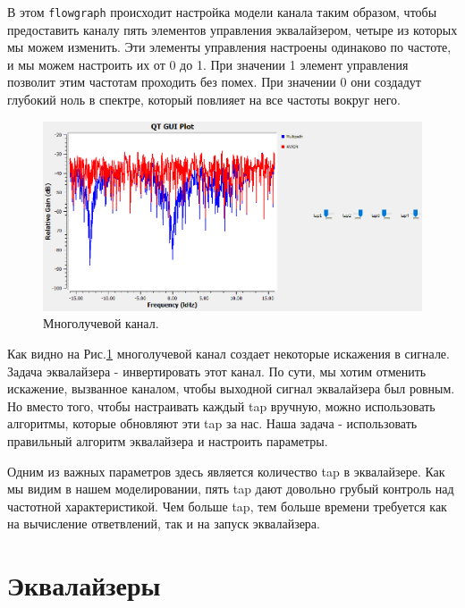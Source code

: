 \documentclass[a4paper, 14pt]{extarticle}
\begin{document}
    В этом \texttt{flowgraph} происходит настройка модели канала таким образом, чтобы предоставить каналу
    пять элементов управления эквалайзером, четыре из которых мы можем изменить.
    Эти элементы управления настроены одинаково по частоте, и мы можем настроить их от 0 до 1.
    При значении 1 элемент управления позволит этим частотам проходить без помех.
    При значении 0 они создадут глубокий ноль в спектре, который повлияет на все частоты вокруг него.

    \begin{figure}[H]
        \centering
        \includegraphics[width=0.9\linewidth]{resources/Images/task4_multipath_channel}
        \caption{Многолучевой канал.}
        \label{fig:task4_multipath_channel}
    \end{figure}

    Как видно на Рис.\ref{fig:task4_multipath_channel} многолучевой канал создает некоторые искажения в сигнале.
    Задача эквалайзера - инвертировать этот канал.
    По сути, мы хотим отменить искажение, вызванное каналом, чтобы выходной сигнал эквалайзера был ровным.
    Но вместо того, чтобы настраивать каждый tap вручную, можно использовать алгоритмы,
    которые обновляют эти tap за нас.
    Наша задача - использовать правильный алгоритм эквалайзера и настроить параметры.

    Одним из важных параметров здесь является количество tap в эквалайзере.
    Как мы видим в нашем моделировании, пять tap дают довольно грубый контроль над частотной характеристикой.
    Чем больше tap, тем больше времени требуется как на вычисление ответвлений,
    так и на запуск эквалайзера.

    \newpage

    \section{Эквалайзеры}
    \label{sec:task5}
\end{document}
